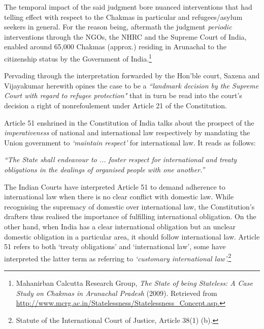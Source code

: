 \begin{multicols}{2}
\vspace{-.15cm}

\noi
The temporal impact of the said judgment bore nuanced interventions that had telling effect
with respect to the Chakmas in particular and refugees/asylum seekers in general. For the
reason being, aftermath the judgment \textit{periodic} interventions through the NGOs, the NHRC
and the Supreme Court of India, enabled around 65,000 Chakmas (approx.) residing in
Arunachal to the citizenship status by the Government of India.\footnote{Mahanirban Calcutta Research Group, \textit{The State of being Stateless: A Case Study on Chakmas in Arunachal Pradesh} (2009). Retrieved from \url{http://www.mcrg.ac.in/Statelessness/Statelessness_Concept.asp.}}

\vspace{-.15cm}

\noi
Pervading through the interpretation forwarded by the Hon’ble court, Saxena and
Vijayakumar herewith opines the case to be a  \textit{``landmark decision by the Supreme Court with
regard to refugee protection"} that in turn be read into the court's decision a right of nonrefoulement under Article 21 of the Constitution.

\vspace{-.15cm}


\vspace{-.15cm}

\noi
Article 51 enshrined in the Constitution of India talks about the prospect of the
\textit{imperativeness} of national and international law respectively by mandating the Union
government to \textit{‘maintain respect’} for international law. It reads as follows:

\noi
\textit{“The State shall endeavour to ... foster respect for international and treaty obligations in
the dealings of organised people with one another.”}

\noi
The Indian Courts have interpreted Article 51 to demand adherence to international law when
there is no clear conflict with domestic law. While recognising the supremacy of domestic
over international law, the Constitution's drafters thus realised the importance of fulfilling
international obligation. On the other hand, when India has a clear international obligation
but an unclear domestic obligation in a particular area, it should follow international law.
Article 51 refers to both `treaty obligations’ and ‘international law’, some have interpreted the
latter term as referring to \textit{‘customary international law’.}\footnote{Statute of the International Court of Justice, Article 38(1) (b).}


\end{multicols}
